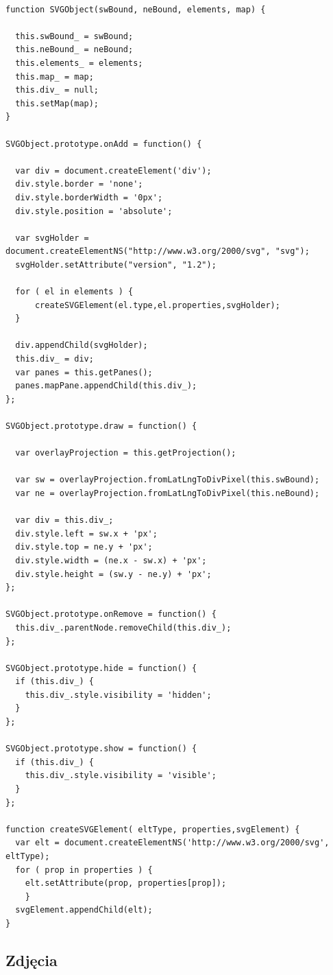\lstset{language=JavaScript}
\begin{lstlisting}[label={lst:svgImpl},caption={Klasa do obsługi SVG}]

function SVGObject(swBound, neBound, elements, map) {

  this.swBound_ = swBound;
  this.neBound_ = neBound;
  this.elements_ = elements;
  this.map_ = map;
  this.div_ = null;
  this.setMap(map);
}

SVGObject.prototype.onAdd = function() {

  var div = document.createElement('div');
  div.style.border = 'none';
  div.style.borderWidth = '0px';
  div.style.position = 'absolute';

  var svgHolder = document.createElementNS("http://www.w3.org/2000/svg", "svg");
  svgHolder.setAttribute("version", "1.2");

  for ( el in elements ) {
	  createSVGElement(el.type,el.properties,svgHolder);
  }

  div.appendChild(svgHolder);
  this.div_ = div;
  var panes = this.getPanes();
  panes.mapPane.appendChild(this.div_);
};

SVGObject.prototype.draw = function() {

  var overlayProjection = this.getProjection();

  var sw = overlayProjection.fromLatLngToDivPixel(this.swBound);
  var ne = overlayProjection.fromLatLngToDivPixel(this.neBound);

  var div = this.div_;
  div.style.left = sw.x + 'px';
  div.style.top = ne.y + 'px';
  div.style.width = (ne.x - sw.x) + 'px';
  div.style.height = (sw.y - ne.y) + 'px';
};

SVGObject.prototype.onRemove = function() {
  this.div_.parentNode.removeChild(this.div_);
};

SVGObject.prototype.hide = function() {
  if (this.div_) {
    this.div_.style.visibility = 'hidden';
  }
};

SVGObject.prototype.show = function() {
  if (this.div_) {
    this.div_.style.visibility = 'visible';
  }
};

function createSVGElement( eltType, properties,svgElement) {
  var elt = document.createElementNS('http://www.w3.org/2000/svg', eltType);
  for ( prop in properties ) {
    elt.setAttribute(prop, properties[prop]);
    }
  svgElement.appendChild(elt);
}

\end{lstlisting}

\subsection{Zdjęcia}
\label{subsec:pictures}

